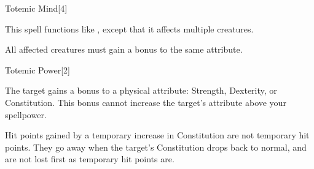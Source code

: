 \begin{spellsection}[Mass]{Totemic Mind}[4]
    \begin{spellheader}
    \end{spellheader}
    \begin{spellcontent}
        \begin{spelltargetinginfo}
        \end{spelltargetinginfo}
        \begin{spelleffects}
            \spellspecial This spell functions like , except that it affects multiple creatures.
            \spelldur \durshort
        \end{spelleffects}
    \end{spellcontent}
    \begin{spellfooter}
        \spellnotes All affected creatures must gain a bonus to the same attribute.
    \end{spellfooter}
\end{spellsection}

\begin{spellsection}{Totemic Power}[2]
    \begin{spellheader}
    \end{spellheader}
    \begin{spellcontent}
        \begin{spelltargetinginfo}
        \end{spelltargetinginfo}
        \begin{spelleffects}
            \spelleffect The target gains a  bonus to a physical attribute: Strength, Dexterity, or Constitution. This bonus cannot increase the target's attribute above your spellpower.
            \spelldur \durpersonallong
        \end{spelleffects}
    \end{spellcontent}
    \begin{spellfooter}
        \spellnotes Hit points gained by a temporary increase in Constitution are not temporary hit points. They go away when the target's Constitution drops back to normal, and are not lost first as temporary hit points are.
    \end{spellfooter}
\end{spellsection}

